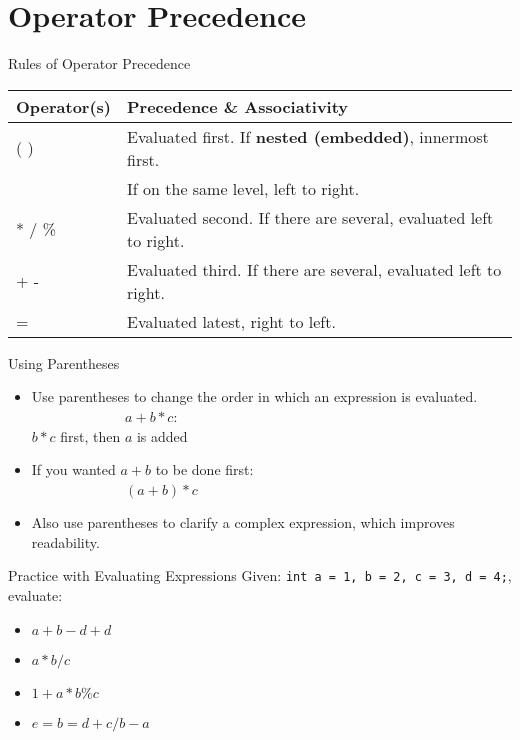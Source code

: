 \documentclass[graphics]{beamer}
\begin{document}
\section{Operator Precedence}\label{sec:opprec}
\begin{frame}{Rules of Operator Precedence}
    \begin{tabular}{l l}
        Operator(s) & Precedence \& Associativity \\ \hline
        ( ) & Evaluated first. If \textbf{nested (embedded)}, innermost first. \\
        & If on the same level, left to right. \\
        * / \% & Evaluated second. If there are several, evaluated left to right. \\
        + - & Evaluated third. If there are several, evaluated left to right. \\
        = & Evaluated latest, right to left.
    \end{tabular}
\end{frame}

\begin{frame}{Using Parentheses}
    \begin{itemize}
        \item Use parentheses to change the order in which an expression is evaluated. \\
        ~~ ~~ ~~ ~~ ~~ $a + b * c$: \\ 
        $b*c$ first, then $a$ is added
        \item If you wanted $a + b$ to be done first: \\
        ~~ ~~ ~~ ~~ ~~ $(a + b) * c$
        \item Also use parentheses to clarify a complex expression, which improves readability.
    \end{itemize}
\end{frame}

\begin{frame}{Practice with Evaluating Expressions}
    Given: \texttt{int a = 1, b = 2, c = 3, d = 4;}, evaluate:
    \begin{itemize}
        \item $a + b - d + d$ 
        \item $a * b / c$ 
        \item $1 + a * b \% c$ 
        \item $e = b = d + c / b - a$ 
    \end{itemize}
\end{frame}
\end{document}
